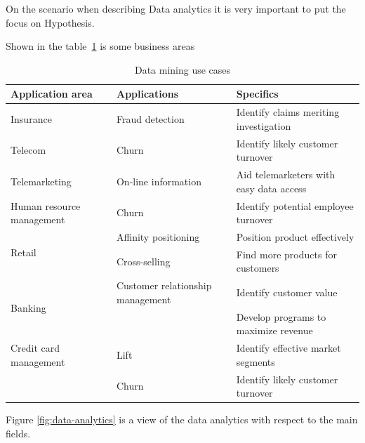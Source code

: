 On the scenario when describing Data analytics it is very important to put the focus on Hypothesis.

Shown in the table~\ref{tableDMusecase} is some business areas 


\begin{table}[H]
	\centering
	\begin{tabular}{|p{4cm}|p{4cm}|l|}
		\hline
		\textbf{Application area} & \textbf{Applications} & \textbf{Specifics}\\
		\hline
		Insurance & Fraud detection & Identify claims meriting investigation\\
		\hline
		Telecom & Churn & Identify likely customer turnover\\
		\hline
		Telemarketing & On-line information & Aid telemarketers with easy data access\\
		\hline
		Human resource management & Churn & Identify potential employee turnover\\
		\hline
		\multirow{2}{4em}{Retail}  & Affinity positioning & Position product effectively\\
		& Cross-selling & Find more products for customers\\
		\hline
		\multirow{2}{4em}{Banking} & Customer relationship management & Identify customer value\\
		&& Develop programs to maximize revenue\\
		\hline
		Credit card management & Lift & Identify effective market segments\\
		& Churn & Identify likely customer turnover\\
		\hline
	\end{tabular}
	\caption{Data mining use cases}
	\label{tableDMusecase}
\end{table}

Figure \ref{fig:data-analytics} is a view of the data analytics with respect to the main fields.

